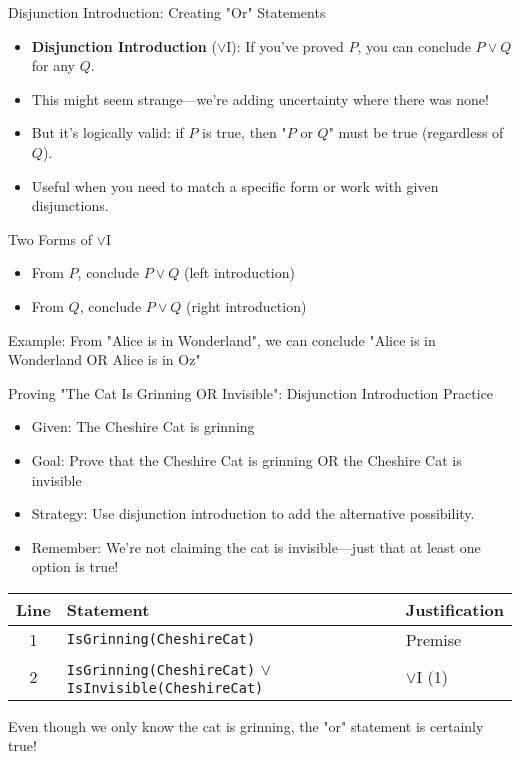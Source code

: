 \documentclass{beamer}
\begin{document}
	\begin{frame}{Disjunction Introduction: Creating "Or" Statements}
		\begin{itemize}
			\item \textbf{Disjunction Introduction} ($\lor$I): If you've proved $P$, you can conclude $P \lor Q$ for any $Q$.
			\item This might seem strange—we're adding uncertainty where there was none!
			\item But it's logically valid: if $P$ is true, then "$P$ or $Q$" must be true (regardless of $Q$).
			\item Useful when you need to match a specific form or work with given disjunctions.
		\end{itemize}
		
		\begin{block}{Two Forms of $\lor$I}
			\begin{itemize}
				\item From $P$, conclude $P \lor Q$ (left introduction)
				\item From $Q$, conclude $P \lor Q$ (right introduction)
			\end{itemize}
			Example: From "Alice is in Wonderland", we can conclude "Alice is in Wonderland OR Alice is in Oz"
		\end{block}
	\end{frame}
	
	\begin{frame}{Proving "The Cat Is Grinning OR Invisible": Disjunction Introduction Practice}
		\begin{itemize}
			\item Given: The Cheshire Cat is grinning
			\item Goal: Prove that the Cheshire Cat is grinning OR the Cheshire Cat is invisible
			\item Strategy: Use disjunction introduction to add the alternative possibility.
			\item Remember: We're not claiming the cat is invisible—just that at least one option is true!
		\end{itemize}
		
		\begin{example}
			\scriptsize{
			\begin{tabular}{|c|l|l|}
				\hline
				\textbf{Line} & \textbf{Statement} & \textbf{Justification} \\
				\hline
				1 & \texttt{IsGrinning(CheshireCat)} & Premise \\
				2 & \texttt{IsGrinning(CheshireCat)} $\lor$ \texttt{IsInvisible(CheshireCat)} & $\lor$I (1) \\
				\hline
			\end{tabular}
			
			Even though we only know the cat is grinning, the "or" statement is certainly true!
		}
		\end{example}
	\end{frame}
	
\end{document}
